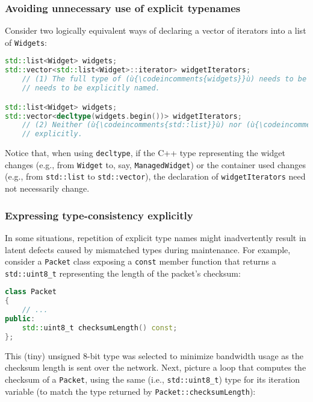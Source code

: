 \subsubsection[Avoiding unnecessary use of explicit typenames]{Avoiding unnecessary use of explicit typenames}\label{avoiding-unnecessary-use-of-explicit-typenames}

Consider two logically equivalent ways of declaring a vector of
iterators into a list of \texttt{Widgets}:

\begin{lstlisting}[language=C++]
std::list<Widget> widgets;
std::vector<std::list<Widget>::iterator> widgetIterators;
    // (1) The full type of (ù{\codeincomments{widgets}}ù) needs to be restated, and (ù{\codeincomments{iterator}}ù)
    // needs to be explicitly named.

std::list<Widget> widgets;
std::vector<decltype(widgets.begin())> widgetIterators;
    // (2) Neither (ù{\codeincomments{std::list}}ù) nor (ù{\codeincomments{Widget}}ù) nor (ù{\codeincomments{iterator}}ù) need be named
    // explicitly.
\end{lstlisting}
    
\noindent Notice that, when using \texttt{decltype}, if the C++ type representing
the widget changes (e.g., from \texttt{Widget} to, say,
\texttt{ManagedWidget}) or the container used changes (e.g., from
\texttt{std::list} to \texttt{std::vector}), the declaration of
\texttt{widgetIterators} need not necessarily change.

\subsubsection[Expressing type-consistency explicitly]{Expressing type-consistency explicitly}\label{expressing-type-consistency-explicitly}

In some situations, repetition of explicit type names might
inadvertently result in latent defects caused by mismatched types during
maintenance. For example, consider a \texttt{Packet} class exposing a
\texttt{const} member function that returns a \texttt{std::uint8\_t}
representing the length of the packet's checksum:

\begin{lstlisting}[language=C++]
class Packet
{
    // ...
public:
    std::uint8_t checksumLength() const;
};
\end{lstlisting}
    
\noindent This (tiny) unsigned 8-bit type was selected to minimize bandwidth usage
as the checksum length is sent over the network. Next, picture a loop
that computes the checksum of a \texttt{Packet}, using the same (i.e.,
\texttt{std::uint8\_t}) type for its iteration variable (to match the
type returned by \texttt{Packet::checksumLength}):

